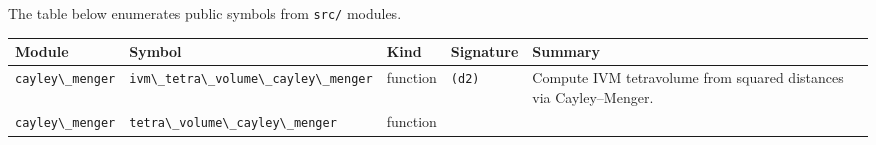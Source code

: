 \documentclass[
  10pt,
]{article}
\newcommand{\passthrough}[1]{#1}
\begin{document}
The table below enumerates public symbols from
\passthrough{\lstinline!src/!} modules.

\begin{longtable}[]{@{}lllll@{}}
\toprule
\begin{minipage}[b]{0.17\columnwidth}\raggedright
Module\strut
\end{minipage} & \begin{minipage}[b]{0.17\columnwidth}\raggedright
Symbol\strut
\end{minipage} & \begin{minipage}[b]{0.17\columnwidth}\raggedright
Kind\strut
\end{minipage} & \begin{minipage}[b]{0.17\columnwidth}\raggedright
Signature\strut
\end{minipage} & \begin{minipage}[b]{0.17\columnwidth}\raggedright
Summary\strut
\end{minipage}\tabularnewline
\midrule
\endhead
\begin{minipage}[t]{0.17\columnwidth}\raggedright
\passthrough{\lstinline!cayley\_menger!}\strut
\end{minipage} & \begin{minipage}[t]{0.17\columnwidth}\raggedright
\passthrough{\lstinline!ivm\_tetra\_volume\_cayley\_menger!}\strut
\end{minipage} & \begin{minipage}[t]{0.17\columnwidth}\raggedright
function\strut
\end{minipage} & \begin{minipage}[t]{0.17\columnwidth}\raggedright
\passthrough{\lstinline!(d2)!}\strut
\end{minipage} & \begin{minipage}[t]{0.17\columnwidth}\raggedright
Compute IVM tetravolume from squared distances via Cayley--Menger.\strut
\end{minipage}\tabularnewline
\begin{minipage}[t]{0.17\columnwidth}\raggedright
\passthrough{\lstinline!cayley\_menger!}\strut
\end{minipage} & \begin{minipage}[t]{0.17\columnwidth}\raggedright
\passthrough{\lstinline!tetra\_volume\_cayley\_menger!}\strut
\end{minipage} & \begin{minipage}[t]{0.17\columnwidth}\raggedright
function\strut
\end{minipage} & \begin{minipage}[t]{0.17\columnwidth}\raggedright

\end{minipage}
\end{longtable}
\end{document}
